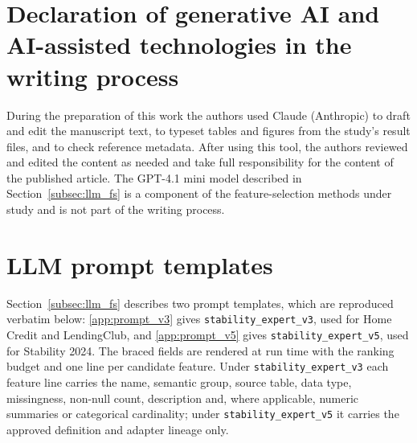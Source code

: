 \documentclass[final,5p,twocolumn]{elsarticle}
\begin{document}
\section*{Declaration of generative AI and AI-assisted technologies in the writing process}
During the preparation of this work the authors used Claude (Anthropic) to draft and edit the manuscript text, to typeset tables and figures from the study's result files, and to check reference metadata. After using this tool, the authors reviewed and edited the content as needed and take full responsibility for the content of the published article. The GPT-4.1 mini model described in Section~\ref{subsec:llm_fs} is a component of the feature-selection methods under study and is not part of the writing process.

\appendix
\section{LLM prompt templates}
\label{app:prompts}

Section~\ref{subsec:llm_fs} describes two prompt templates, which are reproduced verbatim below: \ref{app:prompt_v3} gives \texttt{stability\_\allowbreak expert\_\allowbreak v3}, used for Home Credit and LendingClub, and \ref{app:prompt_v5} gives \texttt{stability\_\allowbreak expert\_\allowbreak v5}, used for Stability 2024. The braced fields are rendered at run time with the ranking budget and one line per candidate feature. Under \texttt{stability\_\allowbreak expert\_\allowbreak v3} each feature line carries the name, semantic group, source table, data type, missingness, non-null count, description and, where applicable, numeric summaries or categorical cardinality; under \texttt{stability\_\allowbreak expert\_\allowbreak v5} it carries the approved definition and adapter lineage only.
\end{document}
